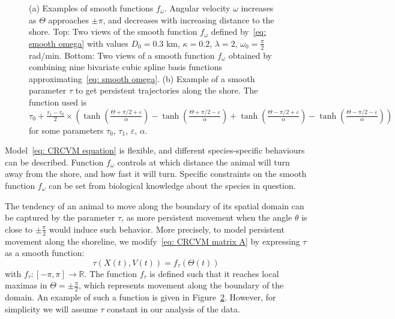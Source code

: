 \documentclass[aoas]{imsart}
\theoremstyle{definition}
\theoremstyle{remark}
\theoremstyle{remark}
\newcommand {\R}{\mathbb{R}}
\newcommand {\1}{\mathbb{1}}
\begin{document}
\begin{figure}[ht!]
\begin{subfigure}{0.48\textwidth}
{		}
		\caption{}
		\label{fig: smoothtau}
	\end{subfigure}
\caption{(a) Examples of smooth functions $f_{\omega}$. Angular velocity $\omega$ increases as $\Theta$ approaches $\pm\pi$, and decreases with increasing distance to the shore.  Top: Two views of the smooth function $f_{\omega}$ defined by~\eqref{eq: smooth omega} with values $D_0=0.3$ km, $\kappa=0.2$, $\lambda=2$, $\omega_0=\frac{\pi}{2}$ rad/min. Bottom: Two views of a smooth function $f_{\omega}$ obtained by combining nine bivariate cubic spline basis functions approximating~\eqref{eq: smooth omega}. (b) Example of a smooth parameter $\tau$ to get persistent trajectories along the shore. The function used is $\tau_0+\frac{\tau_1-\tau_0}{2}\times \left(\tanh(\frac{\Theta+\pi/2+\varepsilon}{\alpha})-\tanh(\frac{\Theta+\pi/2-\varepsilon}{\alpha})+\tanh(\frac{\Theta-\pi/2+\varepsilon}{\alpha})-\tanh(\frac{\Theta-\pi/2-\varepsilon}{\alpha})\right)$ for some parameters $\tau_0$, $\tau_1$, $\varepsilon$, $\alpha$.}
	
\end{figure}

Model~\eqref{eq: CRCVM equation} is flexible, and different species-specific behaviours can be described. Function $f_{\omega}$ controls at which distance the animal will turn away from the shore, and how fast it will turn.  Specific constraints on the smooth function $f_{\omega}$ can be set from biological knowledge about the species in question. 

The tendency of an animal to move along the boundary of its spatial domain can be captured by the parameter $\tau$, as more persistent movement when the angle $\theta$ is close to $\pm\frac{\pi}{2}$ would induce such behavior. More precisely, to model persistent movement along the shoreline, we modify~\eqref{eq: CRCVM matrix A} by expressing $\tau$ as a smooth function:
\[\tau(X(t),V(t))=f_{\tau}(\Theta(t))\] with $f_{\tau}:[-\pi,\pi] \longrightarrow \R$.
The function $f_{\tau}$ is defined such that it reaches local maximas in $\Theta=\pm\frac{\pi}{2}$, which represents movement along the boundary of the domain. An example of such a function is given in Figure~\ref{fig: smoothtau}. However, for simplicity we will assume $\tau$ constant in our analysis of the data.\\
\end{document}
